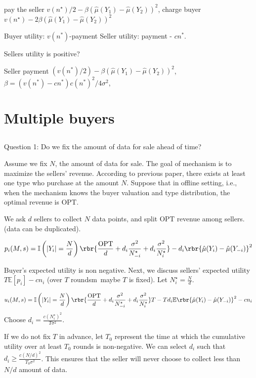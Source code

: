 pay the seller $v(n^{\star})/2 - \beta (\hat{\mu}(Y_1)-\hat{\mu}(Y_2))^2$, charge buyer $v(n^{\star}) - 2\beta (\hat{\mu}(Y_1)-\hat{\mu}(Y_2))^2$


Buyer utility: $v(n^*)$-payment
Seller utility: payment - $cn^*$.

Sellers utility is positive?

Seller payment $(v(n^*)/2)-\beta (\hat{\mu}(Y_1)-\hat{\mu}(Y_2))^2 $, $\beta = (v(n^*)-cn^*)c(n^*)^2 / 4\sigma^2$, 



\section{Multiple buyers}
\subsection{}
Question 1: Do we fix the amount of data for sale ahead of time?


Assume we fix $N$, the amount of data for sale. The goal of mechanism is to maximize the sellers' revenue. According to previous paper, there exists at least one type who purchase at the amount $N$. Suppose that in offline setting, i.e., when the mechanism knows the buyer valuation and type distribution, the optimal revenue is $\text{OPT} $. 


We ask $d$ sellers to collect $N$ data points, and split $\text{OPT} $ revenue among sellers. (data can be duplicated). 

\[ p_i(M,s) =\mathbb{I}\left( \left| Y_i \right| = \frac{N}{d} \right) \rbr{\frac{\text{OPT}}{d}+d_i \frac{\sigma^2}{N_{-i}^{\star}} +d_i \frac{\sigma^2}{N_i^{\star}} }- d_i \rbr{\hat{\mu}(Y_i)-\hat{\mu}(Y_{-i}) }^2  \]

Buyer's expected utility is non negative. Next, we discuss sellers' expected utility $T\mathbb{E}[p_i]- cn_i$ (over $T$ roundsm\, maybe $T$ is fixed). Let $N_i^{\star} = \frac{N}{d}$.

\[ u_i(M,s) = \mathbb{I}\left( \left| Y_i \right| = \frac{N}{d} \right) \rbr{\frac{\text{OPT}}{d}+d_i \frac{\sigma^2}{N_{-i}^{\star}} +d_i \frac{\sigma^2}{N_i^{\star}} }T- Td_i \mathbb{E}\rbr{\hat{\mu}(Y_i)-\hat{\mu}(Y_{-i}) }^2 
 -  cn_i \]
Choose $d_i = \frac{c(N_i^{\star})^2}{T\sigma^2}$.


If we do not fix \( T \) in advance, let \( T_0 \) represent the time at which the cumulative utility over at least \( T_0 \) rounds is non-negative. We can select \( d_i \) such that \( d_i \geq \frac{c(N/d)^2}{T_0 \sigma^2} \). This ensures that the seller will never choose to collect less than \( N/d \) amount of data.








